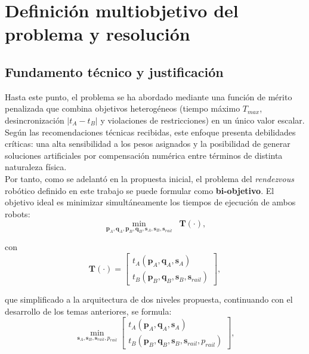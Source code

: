 \newpage
{}
\section*{Definición multiobjetivo del problema y resolución}

\subsection*{Fundamento técnico y justificación}
Hasta este punto, el problema se ha abordado mediante una función de mérito penalizada que 
combina objetivos heterogéneos (tiempo máximo $T_{max}$, desincronización $|t_A - t_B|$ y 
violaciones de restricciones) en un único valor escalar. Según las recomendaciones 
técnicas recibidas, este enfoque presenta debilidades críticas: una alta sensibilidad a los 
pesos asignados y la posibilidad de generar soluciones artificiales por compensación numérica 
entre términos de distinta naturaleza física. \\

Por tanto, como se adelantó en la propuesta inicial, el problema del \textit{rendezvous} robótico 
definido en este trabajo se puede formular como \textbf{bi-objetivo}. El objetivo ideal es 
minimizar simultáneamente los tiempos de ejecución de ambos robots:
\begin{equation}
\min_{\mathbf{p}_A,\mathbf{q}_A,\mathbf{p}_B,\mathbf{q}_B,\mathbf{s}_A,\mathbf{s}_B,\mathbf{s}_{rail}}
\;\; \mathbf{T}(\cdot),
\end{equation}

con
\begin{equation}
\mathbf{T}(\cdot) = 
\begin{bmatrix}
t_A(\mathbf{p}_A,\mathbf{q}_A,\mathbf{s}_A) \\
t_B(\mathbf{p}_B,\mathbf{q}_B,\mathbf{s}_B,\mathbf{s}_{rail})
\end{bmatrix},
\end{equation}

que simplificado a la arquitectura de dos niveles propuesta, continuando
con el desarrollo de los temas anteriores, se formula:
\begin{equation}
\min_{\mathbf{s}_A,\mathbf{s}_B,\mathbf{s}_{rail},p_{rail}}
\left[
\begin{array}{c}
t_A(\mathbf{p}_A,\mathbf{q}_A,\mathbf{s}_A)\\[2mm]
t_B(\mathbf{p}_B,\mathbf{q}_B,\mathbf{s}_B,\mathbf{s}_{rail},p_{rail})
\end{array}
\right],
\label{eq:fo-multi}
\end{equation}

